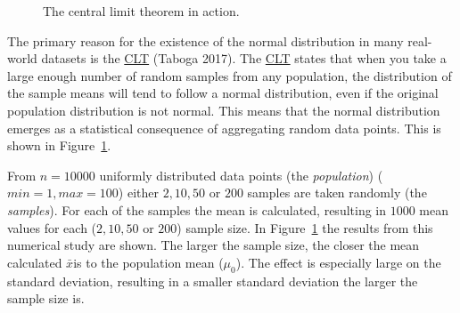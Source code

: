 \documentclass[
  a4paper,
]{scrbook}
\begin{document}
\begin{figure}[ht]


\caption{\label{fig-clt}The central limit theorem in action.}

\end{figure}%

The primary reason for the existence of the normal distribution in many
real-world datasets is the \hyperref[acronyms_CLT]{CLT} (Taboga 2017).
The \hyperref[acronyms_CLT]{CLT} states that when you take a large
enough number of random samples from any population, the distribution of
the sample means will tend to follow a normal distribution, even if the
original population distribution is not normal. This means that the
normal distribution emerges as a statistical consequence of aggregating
random data points. This is shown in Figure~\ref{fig-clt}.

From \(n=10000\) uniformly distributed data points (the
\emph{population}) (\(min=1, max = 100\)) either \(2,10,50\) or \(200\)
samples are taken randomly (the \emph{samples}). For each of the samples
the mean is calculated, resulting in \(1000\) mean values for each
(\(2,10,50\) or \(200\)) sample size. In Figure~\ref{fig-clt} the
results from this numerical study are shown. The larger the sample size,
the closer the mean calculated \hyperref[mean-gloss]{\(\bar{x}\)}is to
the population mean (\hyperref[truemean-gloss]{\(\mu_0\)}). The effect
is especially large on the standard deviation, resulting in a smaller
standard deviation the larger the sample size is.
\end{document}
